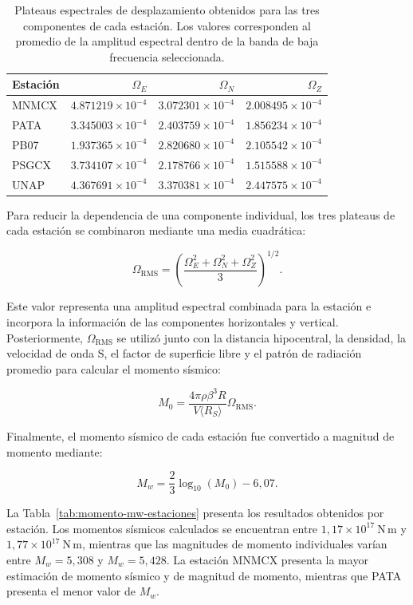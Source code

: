 \documentclass[a4paper,12pt]{article} %
\numberwithin{equation}{section} %
\numberwithin{figure}{section} %
\begin{document}
\begin{table}[]
    \centering
    \caption{Plateaus espectrales de desplazamiento obtenidos para las tres componentes de cada estación. Los valores corresponden al promedio de la amplitud espectral dentro de la banda de baja frecuencia seleccionada.}
    \label{tab:plateaus-componentes}
    \begin{tabular}{l r r r}
        \hline
        Estación & $\Omega_E$ & $\Omega_N$ & $\Omega_Z$ \\
        \hline
        MNMCX & $4.871219\times10^{-4}$ & $3.072301\times10^{-4}$ & $2.008495\times10^{-4}$ \\
        PATA  & $3.345003\times10^{-4}$ & $2.403759\times10^{-4}$ & $1.856234\times10^{-4}$ \\
        PB07  & $1.937365\times10^{-4}$ & $2.820680\times10^{-4}$ & $2.105542\times10^{-4}$ \\
        PSGCX & $3.734107\times10^{-4}$ & $2.178766\times10^{-4}$ & $1.515588\times10^{-4}$ \\
        UNAP  & $4.367691\times10^{-4}$ & $3.370381\times10^{-4}$ & $2.447575\times10^{-4}$ \\
        \hline
    \end{tabular}
\end{table}

Para reducir la dependencia de una componente individual, los tres plateaus de cada estación se combinaron mediante una media cuadrática:

\[
\Omega_{\mathrm{RMS}} =
\left(
\frac{
\Omega_E^2+\Omega_N^2+\Omega_Z^2
}{3}
\right)^{1/2}.
\]

Este valor representa una amplitud espectral combinada para la estación e incorpora la información de las componentes horizontales y vertical. Posteriormente, \(\Omega_{\mathrm{RMS}}\) se utilizó junto con la distancia hipocentral, la densidad, la velocidad de onda S, el factor de superficie libre y el patrón de radiación promedio para calcular el momento sísmico:

\[
M_0 =  \frac{4\pi\rho\beta^3R}{ V\langle R_S \rangle } \Omega_{\mathrm{RMS}}.
\]

Finalmente, el momento sísmico de cada estación fue convertido a magnitud de momento mediante:

\[
M_w =
\frac{2}{3}\log_{10}(M_0)-6{,}07.
\]

La Tabla~\ref{tab:momento-mw-estaciones} presenta los resultados obtenidos por estación. Los momentos sísmicos calculados se encuentran entre \(1{,}17\times10^{17}~\mathrm{N\,m}\) y \(1{,}77\times10^{17}~\mathrm{N\,m}\), mientras que las magnitudes de momento individuales varían entre \(M_w=5{,}308\) y \(M_w=5{,}428\). La estación MNMCX presenta la mayor estimación de momento sísmico y de magnitud de momento, mientras que PATA presenta el menor valor de \(M_w\).
\end{document}
